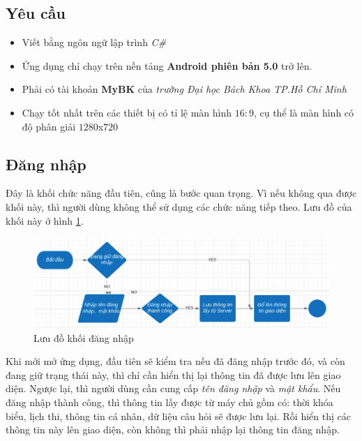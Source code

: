 \documentclass[a4paper]{article}
\begin{document}
\subsection{Yêu cầu}
\begin{itemize}
    \item Viết bằng ngôn ngữ lập trình \textit{C\#}
    \item Ứng dụng chỉ chạy trên nền tảng \textbf{Android phiên bản 5.0} trở lên.
    \item Phải có tài khoản \textbf{MyBK} của \textit{trường Đại học Bách Khoa TP.Hồ Chí Minh}
    \item Chạy tốt nhất trên các thiết bị có tỉ lệ màn hình $16:9$, cụ thể  là màn hình có độ phân giải $1280$x$720$
\end{itemize}
\subsection{Đăng nhập}
\hspace*{.5 cm}Đây là khối chức năng đầu tiên, cũng là bước quan trọng. Vì nếu không qua được khối này, thì người dùng không thể sử dụng các chức năng tiếp theo. Lưu đồ của khối này ở hình \ref{fig:login}. \\
\begin{figure}[H]
    \centering
    \includegraphics[scale=.4]{loginflow.png}
    \caption{Lưu đồ khối đăng nhập}
    \label{fig:login}
\end{figure}
\hspace*{.5 cm}Khi mới mở ứng dụng, đầu tiên sẽ kiểm tra nếu đã đăng nhập trước đó, và còn đang giữ trạng thái này, thì chỉ cần hiển thị lại thông tin đã được lưu lên giao diện. Ngược lại, thì người dùng cần cung cấp \textit{tên đăng nhập} và \textit{mật khẩu}. Nếu đăng nhập thành công, thì thông tin lấy được từ máy chủ gồm có: thời khóa biểu, lịch thi, thông tin cá nhân, dữ liệu câu hỏi sẽ được lưu lại. Rồi hiển thị các thông tin này lên giao diện, còn không thì phải nhập lại thông tin đăng nhập.
\end{document}

